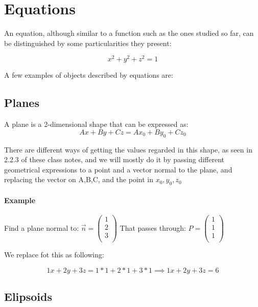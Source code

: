 \documentclass[11pt,fleqn]{book} %
\begin{document}
\section{Equations}

An equation, although similar to a function such as the ones studied so far,
can be distinguished by some particularities they present: 

$$ x^2 + y^2 + z^2 = 1$$

A few examples of objects described by equations are:

\subsection{Planes}

A plane is a 2-dimensional shape that can be expressed as:
\begin{equation}
    Ax + By + Cz = Ax_0 + By_0 + Cz_0
\end{equation}

There are different ways of getting the values regarded in this shape, as seen in 2.2.3 of these class notes, and we will mostly
do it by passing different geometrical expressions to a point and a vector normal to the plane, and replacing the vector 
on A,B,C, and the point in $ x_0, y_0, z_0 $

\paragraph{Example}

Find a plane normal to: $ \vec{n} = \begin{pmatrix}
    1 \\
    2 \\
    3 \\
\end{pmatrix} $
That passes through:
$ P = \begin{pmatrix}
    1 \\
    1 \\
    1 \\
\end{pmatrix} $

We replace fot this as following:

\begin{equation}
    1x + 2y + 3z = 1*1+2*1+3*1 \implies 1x + 2y + 3z = 6
\end{equation}


\subsection{Elipsoids}
\end{document}
